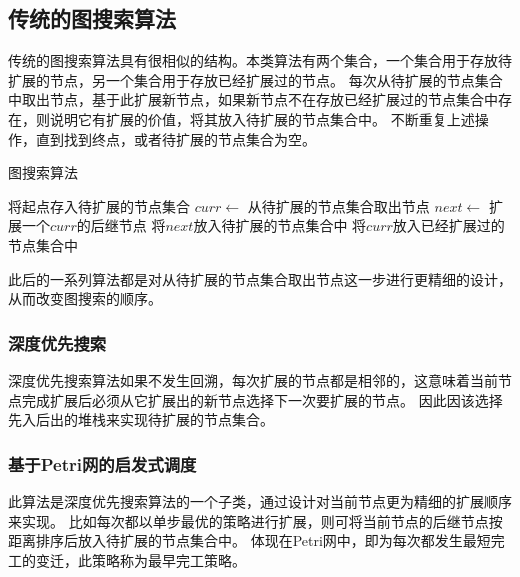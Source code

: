     \subsection{传统的图搜索算法}
        传统的图搜索算法具有很相似的结构。本类算法有两个集合，一个集合用于存放待扩展的节点，另一个集合用于存放已经扩展过的节点。
        每次从待扩展的节点集合中取出节点，基于此扩展新节点，如果新节点不在存放已经扩展过的节点集合中存在，则说明它有扩展的价值，将其放入待扩展的节点集合中。
        不断重复上述操作，直到找到终点，或者待扩展的节点集合为空。
        \begin{algorithm}[H]
            \caption{图搜索算法}
            \label{alg2-2}
            \begin{algorithmic}
                    \State 将起点存入待扩展的节点集合
                        \State $curr \leftarrow$ 从待扩展的节点集合取出节点
                            \State $next \leftarrow$ 扩展一个$curr$的后继节点
                                \State 将$next$放入待扩展的节点集合中
                            \EndIf
                        \EndWhile
                        \State 将$curr$放入已经扩展过的节点集合中
                    \EndWhile
                \EndProcedure
            \end{algorithmic}
        \end{algorithm}
        此后的一系列算法都是对从待扩展的节点集合取出节点这一步进行更精细的设计，从而改变图搜索的顺序。
        \subsubsection{深度优先搜索}
        深度优先搜索算法如果不发生回溯，每次扩展的节点都是相邻的，这意味着当前节点完成扩展后必须从它扩展出的新节点选择下一次要扩展的节点。
        因此因该选择先入后出的堆栈来实现待扩展的节点集合\cite{chen2019depth}\cite{liu2018improved}\cite{wu2017depth}\cite{zhang2016novel}\cite{chen2015improved}。
        \subsubsection{基于Petri网的启发式调度}
        此算法是深度优先搜索算法的一个子类，通过设计对当前节点更为精细的扩展顺序来实现。
        比如每次都以单步最优的策略进行扩展，则可将当前节点的后继节点按距离排序后放入待扩展的节点集合中。
        体现在Petri网中，即为每次都发生最短完工的变迁，此策略称为最早完工策略\cite{johnson1954optimal}\cite{wagner1959theory}\cite{winston1969production}\cite{mather1972production}\cite{graves1981production}。
